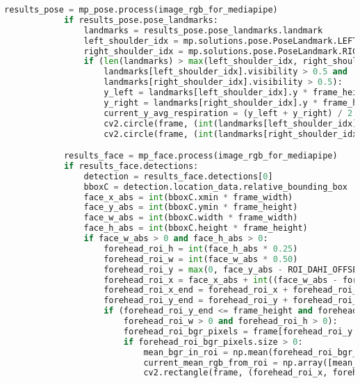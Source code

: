 \documentclass[11pt,a4paper]{article}
\begin{document}
\begin{lstlisting}[language=Python, caption=Kelas RealTimeSignalWorker,label={labelkode}]
            results_pose = mp_pose.process(image_rgb_for_mediapipe)
            if results_pose.pose_landmarks:
                landmarks = results_pose.pose_landmarks.landmark
                left_shoulder_idx = mp.solutions.pose.PoseLandmark.LEFT_SHOULDER.value
                right_shoulder_idx = mp.solutions.pose.PoseLandmark.RIGHT_SHOULDER.value
                if (len(landmarks) > max(left_shoulder_idx, right_shoulder_idx) and
                    landmarks[left_shoulder_idx].visibility > 0.5 and
                    landmarks[right_shoulder_idx].visibility > 0.5):
                    y_left = landmarks[left_shoulder_idx].y * frame_height
                    y_right = landmarks[right_shoulder_idx].y * frame_height
                    current_y_avg_respiration = (y_left + y_right) / 2.0
                    cv2.circle(frame, (int(landmarks[left_shoulder_idx].x * frame_width), int(y_left)), 5, (0, 255, 0), -1)
                    cv2.circle(frame, (int(landmarks[right_shoulder_idx].x * frame_width), int(y_right)), 5, (0, 255, 0), -1)

            results_face = mp_face.process(image_rgb_for_mediapipe)
            if results_face.detections:
                detection = results_face.detections[0] 
                bboxC = detection.location_data.relative_bounding_box 
                face_x_abs = int(bboxC.xmin * frame_width)
                face_y_abs = int(bboxC.ymin * frame_height)
                face_w_abs = int(bboxC.width * frame_width)
                face_h_abs = int(bboxC.height * frame_height)
                if face_w_abs > 0 and face_h_abs > 0:
                    forehead_roi_h = int(face_h_abs * 0.25) 
                    forehead_roi_w = int(face_w_abs * 0.50) 
                    forehead_roi_y = max(0, face_y_abs - ROI_DAHI_OFFSET_Y_KE_ATAS) 
                    forehead_roi_x = face_x_abs + int((face_w_abs - forehead_roi_w) / 2) 
                    forehead_roi_x_end = forehead_roi_x + forehead_roi_w
                    forehead_roi_y_end = forehead_roi_y + forehead_roi_h 
                    if (forehead_roi_y_end <= frame_height and forehead_roi_x_end <= frame_width and
                        forehead_roi_w > 0 and forehead_roi_h > 0):
                        forehead_roi_bgr_pixels = frame[forehead_roi_y:forehead_roi_y_end, forehead_roi_x:forehead_roi_x_end]
                        if forehead_roi_bgr_pixels.size > 0:
                            mean_bgr_in_roi = np.mean(forehead_roi_bgr_pixels, axis=(0,1))
                            current_mean_rgb_from_roi = np.array([mean_bgr_in_roi[2], mean_bgr_in_roi[1], mean_bgr_in_roi[0]])
                            cv2.rectangle(frame, (forehead_roi_x, forehead_roi_y), (forehead_roi_x_end, forehead_roi_y_end), (0,0,255), 2)
            

\end{lstlisting}
\end{document}
